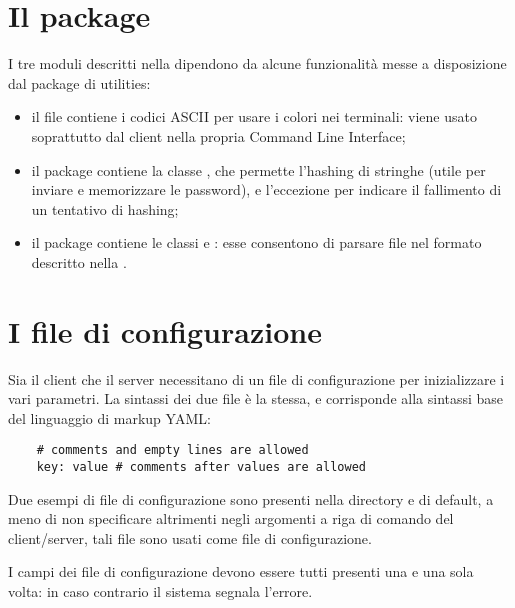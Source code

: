 \documentclass[
    oneside,
    10pt,
    language=italian,
    a4paper,
    article
]{notes}
\begin{document}
\section{Il package }
I tre moduli descritti nella  dipendono da alcune funzionalità
messe a disposizione dal package di utilities:
\begin{itemize}
    \item il file  contiene i codici ASCII
        per usare i colori nei terminali: viene usato soprattutto dal client
        nella propria Command Line Interface;
    \item il package  contiene la classe
        , che permette l'hashing di stringhe (utile per
        inviare e memorizzare le password), e l'eccezione 
         per indicare il fallimento di un tentativo
        di hashing;
    \item il package  contiene le classi
         e : esse consentono di parsare
        file nel formato descritto nella .
\end{itemize}

\section{I file di configurazione} \label{sec:config}
Sia il client che il server necessitano di un file di configurazione per 
inizializzare i vari parametri. La sintassi dei due file è la stessa, e corrisponde
alla sintassi base del linguaggio di markup YAML:
\begin{verbatim}
    # comments and empty lines are allowed
    key: value # comments after values are allowed
\end{verbatim}
Due esempi di file di configurazione sono presenti nella directory 
e di default, a meno di non specificare altrimenti negli argomenti a riga di
comando del client/server, tali file sono usati come file di configurazione.  

I campi dei file di configurazione devono essere tutti presenti una e una sola 
volta: in caso contrario il sistema segnala l'errore.
\end{document}
